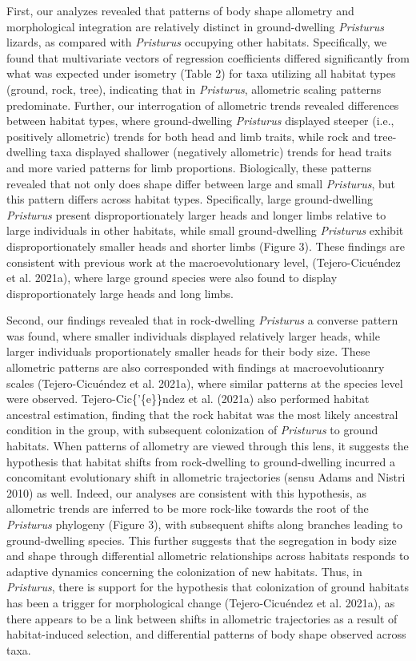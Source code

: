 \documentclass[
  11pt,
]{article}
\begin{document}
First, our analyzes revealed that patterns of body shape allometry and
morphological integration are relatively distinct in ground-dwelling
\emph{Pristurus} lizards, as compared with \emph{Pristurus} occupying
other habitats. Specifically, we found that multivariate vectors of
regression coefficients differed significantly from what was expected
under isometry (Table 2) for taxa utilizing all habitat types (ground,
rock, tree), indicating that in \emph{Pristurus}, allometric scaling
patterns predominate. Further, our interrogation of allometric trends
revealed differences between habitat types, where ground-dwelling
\emph{Pristurus} displayed steeper (i.e., positively allometric) trends
for both head and limb traits, while rock and tree-dwelling taxa
displayed shallower (negatively allometric) trends for head traits and
more varied patterns for limb proportions. Biologically, these patterns
revealed that not only does shape differ between large and small
\emph{Pristurus}, but this pattern differs across habitat types.
Specifically, large ground-dwelling \emph{Pristurus} present
disproportionately larger heads and longer limbs relative to large
individuals in other habitats, while small ground-dwelling
\emph{Pristurus} exhibit disproportionately smaller heads and shorter
limbs (Figure 3). These findings are consistent with previous work at
the macroevolutionary level, (Tejero-Cicuéndez et al. 2021a), where
large ground species were also found to display disproportionately large
heads and long limbs. \hfill\break

Second, our findings revealed that in rock-dwelling \emph{Pristurus} a
converse pattern was found, where smaller individuals displayed
relatively larger heads, while larger individuals proportionately
smaller heads for their body size. These allometric patterns are also
corresponded with findings at macroevolutioanry scales (Tejero-Cicuéndez
et al. 2021a), where similar patterns at the species level were
observed. Tejero-Cic\{'\{e\}\}ndez et al. (2021a) also performed habitat
ancestral estimation, finding that the rock habitat was the most likely
ancestral condition in the group, with subsequent colonization of
\emph{Pristurus} to ground habitats. When patterns of allometry are
viewed through this lens, it suggests the hypothesis that habitat shifts
from rock-dwelling to ground-dwelling incurred a concomitant
evolutionary shift in allometric trajectories (sensu Adams and Nistri
2010) as well. Indeed, our analyses are consistent with this hypothesis,
as allometric trends are inferred to be more rock-like towards the root
of the \emph{Pristurus} phylogeny (Figure 3), with subsequent shifts
along branches leading to ground-dwelling species. This further suggests
that the segregation in body size and shape through differential
allometric relationships across habitats responds to adaptive dynamics
concerning the colonization of new habitats. Thus, in \emph{Pristurus},
there is support for the hypothesis that colonization of ground habitats
has been a trigger for morphological change (Tejero-Cicuéndez et al.
2021a), as there appears to be a link between shifts in allometric
trajectories as a result of habitat-induced selection, and differential
patterns of body shape observed across taxa. \hfill\break
\end{document}
